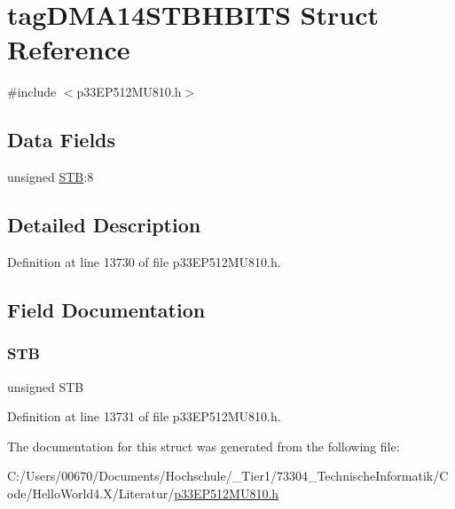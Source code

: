 \hypertarget{structtag_d_m_a14_s_t_b_h_b_i_t_s}{}\section{tag\+D\+M\+A14\+S\+T\+B\+H\+B\+I\+TS Struct Reference}
\label{structtag_d_m_a14_s_t_b_h_b_i_t_s}


{\ttfamily \#include $<$p33\+E\+P512\+M\+U810.\+h$>$}

\subsection*{Data Fields}
\begin{DoxyCompactItemize}
\item 
unsigned \hyperlink{structtag_d_m_a14_s_t_b_h_b_i_t_s_a9bd043a4db27e09b5035a563a8758fe7}{S\+TB}\+:8
\end{DoxyCompactItemize}


\subsection{Detailed Description}


Definition at line 13730 of file p33\+E\+P512\+M\+U810.\+h.



\subsection{Field Documentation}
\mbox{\label{structtag_d_m_a14_s_t_b_h_b_i_t_s_a9bd043a4db27e09b5035a563a8758fe7}} 
\subsubsection{\texorpdfstring{S\+TB}{STB}}
{\footnotesize\ttfamily unsigned S\+TB}



Definition at line 13731 of file p33\+E\+P512\+M\+U810.\+h.



The documentation for this struct was generated from the following file\+:\begin{DoxyCompactItemize}
\item 
C\+:/\+Users/00670/\+Documents/\+Hochschule/\+\_\+\+Tier1/73304\+\_\+\+Technische\+Informatik/\+Code/\+Hello\+World4.\+X/\+Literatur/\hyperlink{p33_e_p512_m_u810_8h}{p33\+E\+P512\+M\+U810.\+h}\end{DoxyCompactItemize}
